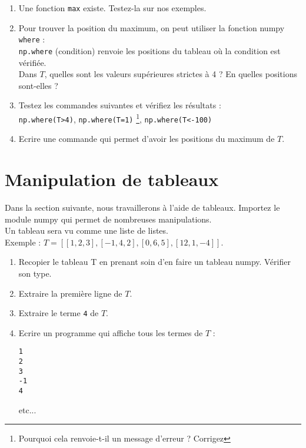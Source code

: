 \begin{exercice}
\begin{enumerate}
\item Une fonction \verb?max? existe. Testez-la sur nos exemples.
\item Pour trouver la position du maximum, on peut utiliser la fonction numpy \verb?where? :\\
\verb?np.where? (condition) renvoie les positions du tableau o\` u la condition est v\' erifi\' ee. \\
Dans $T$, quelles sont les valeurs sup\' erieures strictes \` a 4 ? En quelles positions sont-elles ?
\item Testez les commandes suivantes et v\' erifiez les r\' esultats :\\
\verb?np.where(T>4)?, \verb?np.where(T=1)? \footnote{Pourquoi cela renvoie-t-il un message d'erreur ? Corrigez}, \verb?np.where(T<-100)?
\item Ecrire une commande qui permet d'avoir les positions du maximum de $T$.
\end{enumerate}
\end{exercice}





\section{Manipulation de tableaux}
\begin{defn}
Dans la section suivante, nous travaillerons \` a l'aide de tableaux. Importez le module numpy qui permet de nombreuses manipulations.\\
Un tableau sera vu comme une liste de listes. \\
Exemple : $T=[[1,2,3],[-1,4,2],[0,6,5],[12,1,-4]]$.
\end{defn}

\begin{exercice}
\begin{enumerate}
\item Recopier le tableau T en prenant soin d'en faire un tableau numpy. V\' erifier son type.
\item Extraire la premi\` ere ligne de $T$.
\item Extraire le terme \verb?4? de $T$.
\item Ecrire un programme qui affiche tous les termes de $T$ :
\begin{verbatim}
1
2
3
-1
4
\end{verbatim}
etc...
\end{enumerate}
\end{exercice}

